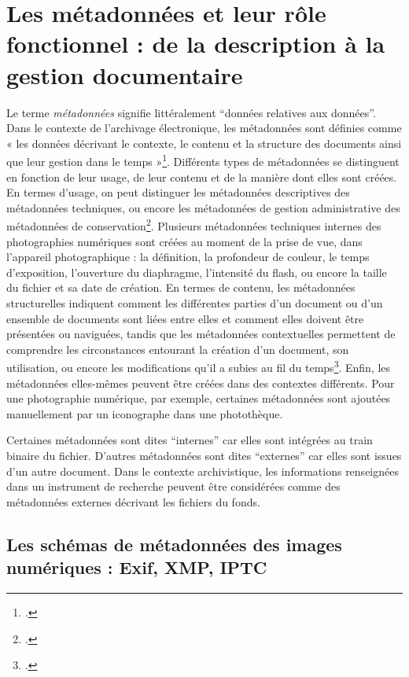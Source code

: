 \section{Les métadonnées et leur rôle fonctionnel : de la description à la gestion documentaire}
Le terme \emph{métadonnées} signifie littéralement \enquote{données relatives aux données}. Dans le contexte de l'archivage électronique, les métadonnées sont définies comme « les données décrivant le contexte, le contenu et la structure des documents ainsi que leur gestion dans le temps »\footcite[p.121]{rietschDematerialisationArchivageElectronique2006}. Différents types de métadonnées se distinguent en fonction de leur usage, de leur contenu et de la manière dont elles sont créées. En termes d'usage, on peut distinguer les métadonnées descriptives des métadonnées techniques, ou encore les métadonnées de gestion administrative des métadonnées de conservation\footcite{clirDidacticielMetadata}. Plusieurs métadonnées techniques internes des photographies numériques sont créées au moment de la prise de vue, dans l'appareil photographique : la définition, la profondeur de couleur, le temps d’exposition, l’ouverture du diaphragme, l’intensité du flash, ou encore la taille du fichier et sa date de création. En termes de contenu, les métadonnées structurelles indiquent comment les différentes parties d'un document ou d'un ensemble de documents sont liées entre elles et comment elles doivent être présentées ou naviguées, tandis que les métadonnées contextuelles permettent de comprendre les circonstances entourant la création d'un document, son utilisation, ou encore les modifications qu'il a subies au fil du temps\footcite[pp.121-122]{rietschDematerialisationArchivageElectronique2006}. Enfin, les métadonnées elles-mêmes peuvent être créées dans des contextes différents. Pour une photographie numérique, par exemple, certaines métadonnées sont ajoutées manuellement par un iconographe dans une photothèque.

Certaines métadonnées sont dites \enquote{internes} car elles sont intégrées au train binaire du fichier. D'autres métadonnées sont dites \enquote{externes} car elles sont issues d'un autre document. Dans le contexte archivistique, les informations renseignées dans un instrument de recherche peuvent être considérées comme des métadonnées externes décrivant les fichiers du fonds. 

\subsection*{Les schémas de métadonnées des images numériques : Exif, XMP, IPTC}

